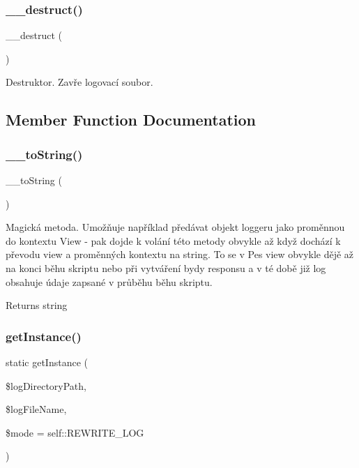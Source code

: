 \subsubsection{\texorpdfstring{\+\_\+\+\_\+destruct()}{\_\_destruct()}}
{\footnotesize\ttfamily \+\_\+\+\_\+destruct (\begin{DoxyParamCaption}{ }\end{DoxyParamCaption})}

Destruktor. Zavře logovací soubor. 

\subsection{Member Function Documentation}
\mbox{\label{class_pes_1_1_logger_1_1_file_logger_a7516ca30af0db3cdbf9a7739b48ce91d}} 
\subsubsection{\texorpdfstring{\+\_\+\+\_\+to\+String()}{\_\_toString()}}
{\footnotesize\ttfamily \+\_\+\+\_\+to\+String (\begin{DoxyParamCaption}{ }\end{DoxyParamCaption})}

Magická metoda. Umožňuje například předávat objekt loggeru jako proměnnou do kontextu View -\/ pak dojde k volání této metody obvykle až když dochází k převodu view a proměnných kontextu na string. To se v Pes view obvykle dějě až na konci běhu skriptu nebo při vytváření bydy responsu a v té době již log obsahuje údaje zapsané v průběhu běhu skriptu.

\begin{DoxyReturn}{Returns}
string 
\end{DoxyReturn}
\mbox{\label{class_pes_1_1_logger_1_1_file_logger_a601307f5beafcd15acf6fd66caeb373a}} 
\subsubsection{\texorpdfstring{get\+Instance()}{getInstance()}}
{\footnotesize\ttfamily static get\+Instance (\begin{DoxyParamCaption}\item[{}]{\$log\+Directory\+Path,  }\item[{}]{\$log\+File\+Name,  }\item[{}]{\$mode = {\ttfamily self\+:\+:REWRITE\+\_\+LOG} }\end{DoxyParamCaption})\hspace{0.3cm}{\ttfamily [static]}}

